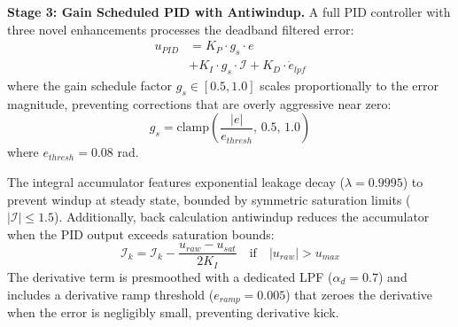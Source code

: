 % 
\textbf{Stage 3: Gain Scheduled PID with Antiwindup.}
A full PID controller \cite{astrom2006advanced} with
three novel enhancements processes the deadband filtered error:
\begin{align}
    u_{PID} &= K_P \cdot g_s \cdot e \nonumber\\
    &+ K_I \cdot g_s \cdot \mathcal{I}
    + K_D \cdot \dot{e}_{lpf}
\end{align}
\noindent where the gain schedule factor $g_s \in [0.5, 1.0]$
scales proportionally to the error magnitude, preventing
corrections that are overly aggressive near zero:
\begin{equation}
    g_s = \text{clamp}\!\left(
    \frac{|e|}{e_{thresh}},\, 0.5,\, 1.0
    \right)
\end{equation}
\noindent where $e_{thresh} = 0.08$ rad.
% 

The integral accumulator features exponential leakage decay
($\lambda = 0.9995$) to prevent windup at steady state, bounded
by symmetric saturation limits ($|\mathcal{I}| \leq 1.5$).
Additionally, back calculation antiwindup reduces the
accumulator when the PID output exceeds saturation bounds:
\begin{equation}
    \mathcal{I}_{k} = \mathcal{I}_{k} -
    \frac{u_{raw} - u_{sat}}{2 K_I}
    \quad \text{if} \quad |u_{raw}| > u_{max}
\end{equation}
The derivative term is presmoothed with a dedicated LPF
($\alpha_d = 0.7$) and includes a derivative ramp threshold
($e_{ramp} = 0.005$) that zeroes the derivative when the error
is negligibly small, preventing derivative kick.

